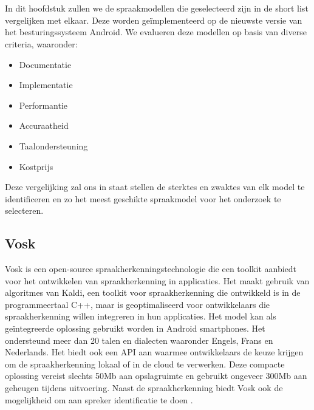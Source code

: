
\chapter{}%
\label{ch:Vergelijkende studie}

In dit hoofdstuk zullen we de spraakmodellen die geselecteerd zijn in de short list vergelijken met elkaar. Deze worden geïmplementeerd op de nieuwste versie van het besturingssysteem Android. We evalueren deze modellen op basis van diverse criteria, waaronder:

\begin{itemize}
  \item Documentatie
  \item Implementatie
  \item Performantie
  \item Accuraatheid
  \item Taalondersteuning
  \item Kostprijs
\end{itemize}

Deze vergelijking zal ons in staat stellen de sterktes en zwaktes van elk model te identificeren en zo het meest geschikte spraakmodel voor het onderzoek te selecteren.

\section{Vosk}
Vosk is een open-source spraakherkenningstechnologie die een toolkit aanbiedt voor het ontwikkelen van spraakherkenning in applicaties. Het maakt gebruik van algoritmes van Kaldi, een toolkit voor spraakherkenning die ontwikkeld is in de programmeertaal C++, maar is geoptimaliseerd voor ontwikkelaars die spraakherkenning willen integreren in hun applicaties. Het model kan als geïntegreerde oplossing gebruikt worden in Android smartphones. Het ondersteund meer dan 20 talen en dialecten waaronder Engels, Frans en Nederlands. Het biedt ook een API aan waarmee ontwikkelaars de keuze krijgen om de spraakherkenning lokaal of in de cloud te verwerken. Deze compacte oplossing vereist slechts 50Mb aan opslagruimte en gebruikt ongeveer 300Mb aan geheugen tijdens uitvoering. Naast de spraakherkenning biedt Vosk ook de mogelijkheid om aan spreker identificatie te doen \autocite{HafizMuhammad2022}.

